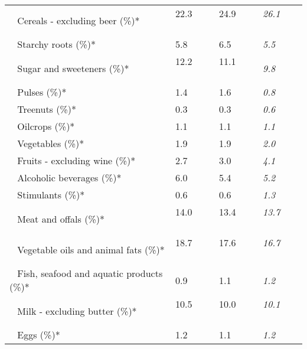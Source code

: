 \begin{tabular}{L{3.9cm} R{1cm} R{1cm} R{1cm}}
	 ~ Cereals - excluding beer (\%)* & 22.3 ~ \ \ & 24.9 ~ \ \ & \textit{26.1} ~ \ \ \\ 
	 ~ Starchy roots (\%)* & 5.8 ~ \ \ & 6.5 ~ \ \ & \textit{5.5} ~ \ \ \\ 
	 ~ Sugar and sweeteners (\%)* & 12.2 ~ \ \ & 11.1 ~ \ \ & \textit{9.8} ~ \ \ \\ 
	 ~ Pulses (\%)* & 1.4 ~ \ \ & 1.6 ~ \ \ & \textit{0.8} ~ \ \ \\ 
	 ~ Treenuts (\%)* & 0.3 ~ \ \ & 0.3 ~ \ \ & \textit{0.6} ~ \ \ \\ 
	 ~ Oilcrops (\%)* & 1.1 ~ \ \ & 1.1 ~ \ \ & \textit{1.1} ~ \ \ \\ 
	 ~ Vegetables (\%)* & 1.9 ~ \ \ & 1.9 ~ \ \ & \textit{2.0} ~ \ \ \\ 
	 ~ Fruits - excluding wine (\%)* & 2.7 ~ \ \ & 3.0 ~ \ \ & \textit{4.1} ~ \ \ \\ 
	 ~ Alcoholic beverages (\%)* & 6.0 ~ \ \ & 5.4 ~ \ \ & \textit{5.2} ~ \ \ \\ 
	 ~ Stimulants (\%)* & 0.6 ~ \ \ & 0.6 ~ \ \ & \textit{1.3} ~ \ \ \\ 
	 ~ Meat and offals (\%)* & 14.0 ~ \ \ & 13.4 ~ \ \ & \textit{13.7} ~ \ \ \\ 
	 ~ Vegetable oils and animal fats (\%)* & 18.7 ~ \ \ & 17.6 ~ \ \ & \textit{16.7} ~ \ \ \\ 
	 ~ Fish, seafood and aquatic products (\%)* & 0.9 ~ \ \ & 1.1 ~ \ \ & \textit{1.2} ~ \ \ \\ 
	 ~ Milk - excluding butter (\%)* & 10.5 ~ \ \ & 10.0 ~ \ \ & \textit{10.1} ~ \ \ \\ 
	 ~ Eggs (\%)* & 1.2 ~ \ \ & 1.1 ~ \ \ & \textit{1.2} ~ \ \ \\ 
       \toprule
      \end{tabular}
      \clearpage
{}
